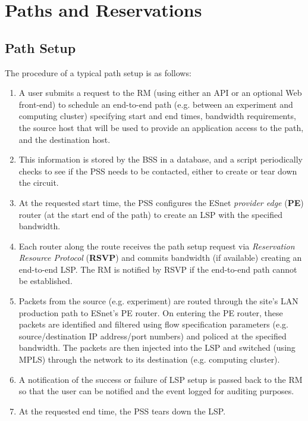 \documentclass[conference]{IEEEtran}
\begin{document}
\section{Paths and Reservations}

\subsection{Path Setup}

The procedure of a typical path setup is as follows:

\begin{enumerate}
\item
A user submits a request to the RM (using either an API or
an optional Web front-end) to schedule an end-to-end path (e.g. between an
experiment and computing cluster) specifying start and end times, bandwidth
requirements, the source host that will be used 
to provide an application access to the path, and the destination host.

\item
This information is stored by the BSS in a database, and a script 
periodically checks to see if the PSS needs to be contacted, either to create 
or tear down the circuit.

\item
At the requested start time, the PSS configures the 
ESnet \emph{provider edge} (\textbf{PE}) router
(at the start end of the path) to create an LSP with the
specified bandwidth.

\item
Each router along the route receives the path setup request 
via \emph{Reservation Resource Protocol} (\textbf{RSVP}) \cite{rsvp}
and commits bandwidth (if available) creating an end-to-end LSP.  The RM is
notified by RSVP if the end-to-end path cannot be established.

\item
Packets from the source (e.g. experiment) are routed through the site's
LAN production path to ESnet's PE router.  On entering the PE router,
these packets are identified and filtered using flow specification parameters
(e.g. source/destination IP address/port numbers) and policed at the specified
bandwidth.  The packets are then injected into the LSP and switched (using MPLS)
through the network to its destination (e.g. computing cluster).

\item
A notification of the success or failure of LSP setup is 
passed back to the RM so that the user can be notified and the event 
logged for auditing purposes.

\item
At the requested end time, the PSS tears down the LSP.
\end{enumerate}
\end{document}
